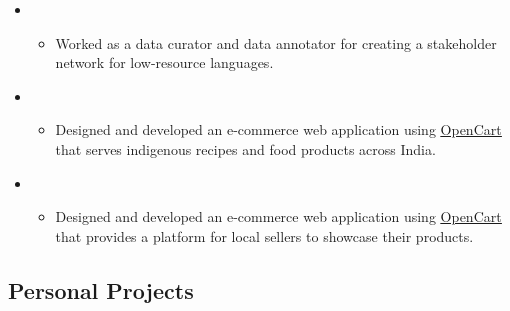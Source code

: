 \documentclass[11pt,a4paper,sans]{moderncv}
\begin{document}
\begin{itemize}
\begin{itemize}
\begin{itemize}
\end{itemize}
\vspace{6pt}
\item{}

\begin{itemize}
    \item Worked as a data curator and data annotator for creating a stakeholder network for low-resource languages.

\end{itemize}

\vspace{6pt}
\item{}

\begin{itemize}
    \item Designed and developed an e-commerce web application using {\href{https://www.opencart.com/}{\underline {OpenCart}}} that serves indigenous recipes and food products across India.

\end{itemize}

\vspace{6pt}
\item{}

\begin{itemize}
    \item Designed and developed an e-commerce web application using {\href{https://www.opencart.com/}{\underline {OpenCart}}} that provides a platform for local sellers to showcase their products.

\end{itemize}

\end{itemize}

\vspace{6pt}

\subsection{Personal Projects}

\begin{itemize}

\vspace{6pt}


\end{itemize}
\end{itemize}
\end{document}
